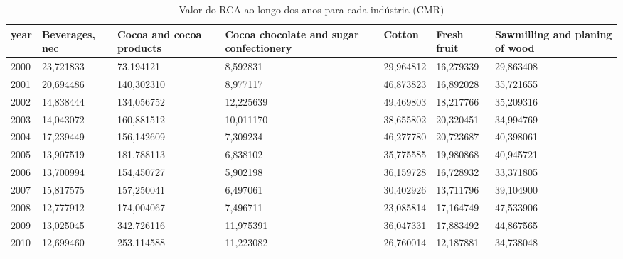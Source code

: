 \begin{table}
\centering
\caption{Valor do RCA ao longo dos anos para cada indústria (CMR)}
\begin{tabular}{p{1cm}p{2cm}p{2cm}p{2cm}p{2cm}p{2cm}p{2cm}}
\toprule
 year &  Beverages, nec &  Cocoa and cocoa products &  Cocoa chocolate and sugar confectionery &    Cotton &  Fresh fruit &  Sawmilling and planing of wood \\
\midrule
 2000 &       23,721833 &                 73,194121 &                                 8,592831 & 29,964812 &    16,279339 &                       29,863408 \\
 2001 &       20,694486 &                140,302310 &                                 8,977117 & 46,873823 &    16,892028 &                       35,721655 \\
 2002 &       14,838444 &                134,056752 &                                12,225639 & 49,469803 &    18,217766 &                       35,209316 \\
 2003 &       14,043072 &                160,881512 &                                10,011170 & 38,655802 &    20,320451 &                       34,994769 \\
 2004 &       17,239449 &                156,142609 &                                 7,309234 & 46,277780 &    20,723687 &                       40,398061 \\
 2005 &       13,907519 &                181,788113 &                                 6,838102 & 35,775585 &    19,980868 &                       40,945721 \\
 2006 &       13,700994 &                154,450727 &                                 5,902198 & 36,159728 &    16,728932 &                       33,371805 \\
 2007 &       15,817575 &                157,250041 &                                 6,497061 & 30,402926 &    13,711796 &                       39,104900 \\
 2008 &       12,777912 &                174,004067 &                                 7,496711 & 23,085814 &    17,164749 &                       47,533906 \\
 2009 &       13,025045 &                342,726116 &                                11,975391 & 36,047331 &    17,883492 &                       44,867565 \\
 2010 &       12,699460 &                253,114588 &                                11,223082 & 26,760014 &    12,187881 &                       34,738048 \\

\end{tabular}
\end{table}
